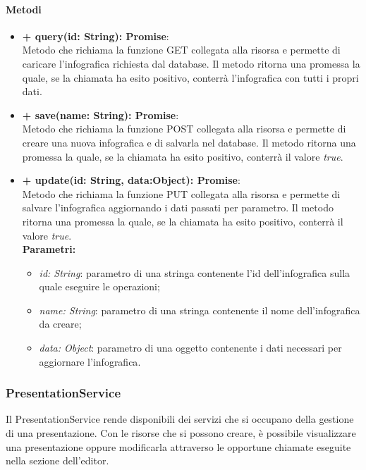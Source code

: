 		\paragraph{Metodi}
		\begin{itemize}
			\item \textbf{+ query(id: String): Promise}:\\
				Metodo che richiama la funzione GET collegata alla risorsa e permette di caricare l'\gls{infografica} richiesta dal \gls{database}. Il metodo ritorna una promessa la quale, se la chiamata ha esito positivo, conterrà l'\gls{infografica} con tutti i propri dati.\\
			\item \textbf{+ save(name: String): Promise}:\\
				Metodo che richiama la funzione POST collegata alla risorsa e permette di creare una nuova \gls{infografica} e di salvarla nel \gls{database}. Il metodo ritorna una promessa la quale, se la chiamata ha esito positivo, conterrà il valore \textit{true}.\\
			\item \textbf{+ update(id: String, data:Object): Promise}:\\
				Metodo che richiama la funzione PUT collegata alla risorsa e permette di salvare l'\gls{infografica} aggiornando i dati passati per parametro. Il metodo ritorna una promessa la quale, se la chiamata ha esito positivo, conterrà il valore \textit{true}.\\
			\textbf{Parametri:}\\
			\begin{itemize}
				\item \textit{id: String}: parametro di una stringa contenente l'id dell'\gls{infografica} sulla quale eseguire le operazioni;
				\item \textit{name: String}: parametro di una stringa contenente il nome dell'\gls{infografica} da creare;
				\item \textit{data: Object}: parametro di una oggetto contenente i dati necessari per aggiornare l'\gls{infografica}.
			\end{itemize}
		\end{itemize}
\newpage


\subsubsection{PresentationService}
Il PresentationService rende disponibili dei servizi che si occupano della gestione di una presentazione. Con le risorse che si possono creare, è possibile visualizzare una presentazione oppure modificarla attraverso le opportune chiamate eseguite nella sezione dell'editor.


